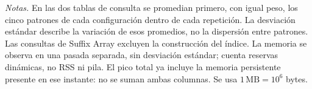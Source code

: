 \noindent\textit{Notas.} En las dos tablas de consulta se promedian primero,
con igual peso, los cinco patrones de cada configuración dentro de cada
repetición. La desviación estándar describe la variación de esos promedios,
no la dispersión entre patrones. Las consultas de Suffix Array excluyen
la construcción del índice. La memoria se observa en una pasada separada,
sin desviación estándar; cuenta reservas dinámicas, no RSS ni pila.
El pico total ya incluye la memoria persistente presente en ese instante:
no se suman ambas columnas. Se usa \(1\,\mathrm{MB}=10^6\) bytes.

\clearpage
